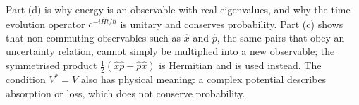 \begin{insightbox}
Part (d) is why energy is an observable with real eigenvalues, and why the time-evolution operator $e^{-i\hat Ht/\hbar}$ is unitary and conserves probability. Part (c) shows that non-commuting observables such as $\hat x$ and $\hat p$, the same pairs that obey an uncertainty relation, cannot simply be multiplied into a new observable; the symmetrised product $\frac12(\hat x\hat p+\hat p\hat x)$ is Hermitian and is used instead. The condition $V^*=V$ also has physical meaning: a complex potential describes absorption or loss, which does not conserve probability.
\end{insightbox}
